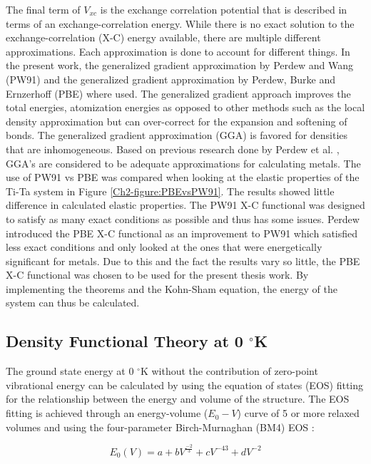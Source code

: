 \noindent The final term of $V_{xc}$ is the exchange correlation potential that is described in terms of an exchange-correlation energy. While there is no exact solution to the exchange-correlation (X-C) energy available, there are multiple different approximations. Each approximation is done to account for different things. In the present work, the generalized gradient approximation by Perdew and Wang (PW91) \cite{Perdew1992} and the generalized gradient approximation by Perdew, Burke and Ernzerhoff (PBE) \cite{Perdew1996a} where used. The generalized gradient approach improves the total energies, atomization energies as opposed to other methods such as the local density approximation \cite{Ceperley1980} but can over-correct for the expansion and softening of bonds. The generalized gradient approximation (GGA) is favored for densities that are inhomogeneous. Based on previous research done by Perdew et al. \cite{Perdew1996a}, GGA's are considered to be adequate approximations for calculating metals. The use of PW91 vs PBE was compared when looking at the elastic properties of the Ti-Ta system in Figure \ref{Ch2-figure:PBEvsPW91}. The results showed little difference in calculated elastic properties. The PW91 X-C functional was designed to satisfy as many exact conditions as possible and thus has some issues. Perdew introduced the PBE X-C functional as an improvement to PW91 which satisfied less exact conditions and only looked at the ones that were energetically significant for metals. Due to this and the fact the results vary so little, the PBE X-C functional was chosen to be used for the present thesis work. By implementing the theorems and the Kohn-Sham equation, the energy of the system can thus be calculated.

\subsection{Density Functional Theory at 0 $^\circ$K}

 The ground state energy at 0 $^\circ$K without the contribution of zero-point vibrational energy can be calculated by using the equation of states (EOS) fitting for the relationship between the energy and volume of the structure. The EOS fitting is achieved through an energy-volume ($E_{0}-V$) curve of 5 or more relaxed volumes and using the four-parameter Birch-Murnaghan (BM4) EOS \cite{Shang2010}:

\begin{equation}
\label{eq: zeroenergy}
E_{0}(V) = a + bV^{\frac{-2}{3}} + cV^{{-4}{3}} + dV^{-2}
\end{equation}

